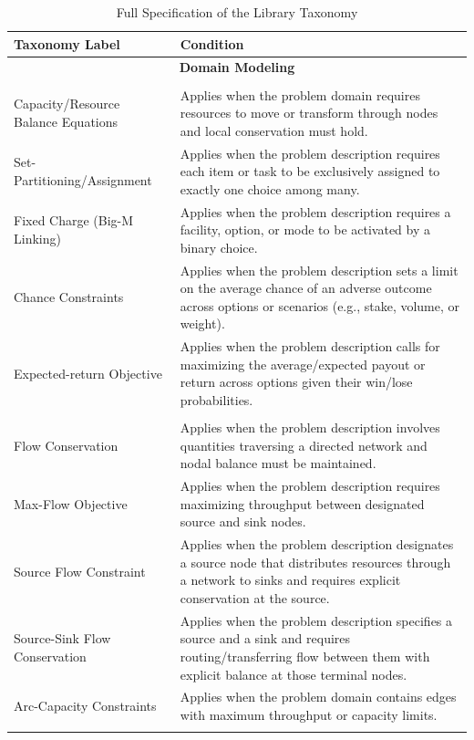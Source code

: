 \documentclass[sigconf, nonacm]{acmart}
\begin{document}
\begin{table}[!t]
\centering
\caption{Full Specification of the Library Taxonomy}
\label{tab:library_taxonomy}
\small
\renewcommand{\arraystretch}{1.12}
\setlength{\tabcolsep}{3pt}
\begin{tabularx}{\textwidth}{l X}
\toprule
\textbf{Taxonomy Label} & \textbf{Condition} \\
\midrule

\multicolumn{2}{c}{\textbf{Domain Modeling}}\\
\addlinespace[3pt]

\multicolumn{2}{l}{\textbf{Resource Allocation}}\\
Capacity/Resource Balance Equations & Applies when the problem domain requires resources to move or transform through nodes and local conservation must hold. \\
Set-Partitioning/Assignment & Applies when the problem description requires each item or task to be exclusively assigned to exactly one choice among many. \\
Fixed Charge (Big-M Linking) & Applies when the problem description requires a facility, option, or mode to be activated by a binary choice. \\
Chance Constraints & Applies when the problem description sets a limit on the average chance of an adverse outcome across options or scenarios (e.g., stake, volume, or weight). \\
Expected-return Objective & Applies when the problem description calls for maximizing the average/expected payout or return across options given their win/lose probabilities. \\
\addlinespace[2pt]

\multicolumn{2}{l}{\textbf{Network Flow}}\\
Flow Conservation & Applies when the problem description involves quantities traversing a directed network and nodal balance must be maintained. \\
Max-Flow Objective & Applies when the problem description requires maximizing throughput between designated source and sink nodes. \\
Source Flow Constraint & Applies when the problem description designates a source node that distributes resources through a network to sinks and requires explicit conservation at the source. \\
Source-Sink Flow Conservation & Applies when the problem description specifies a source and a sink and requires routing/transferring flow between them with explicit balance at those terminal nodes. \\
Arc-Capacity Constraints & Applies when the problem domain contains edges with maximum throughput or capacity limits. \\
\addlinespace[2pt]


\end{tabularx}
\end{table}
\end{document}

